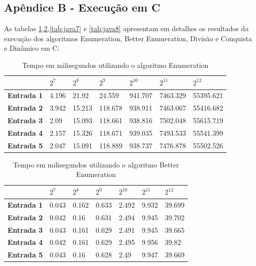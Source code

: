 \documentclass[
	12pt,				%
	oneside,   	        %
	a4paper,			%
	english,			%
	french,				%
	spanish,			%
	brazil,				%
	]{pacotes/abntex2}
\begin{document}
\begin{apendicesenv}

\section*{Apêndice B - Execução em C}

As tabelas \ref{tab:java5},\ref{tab:java6},\ref{tab:java7} e \ref{tab:java8} apresentam em detalhes os resultados da execução dos
algoritmos Enumeration, Better Enumeration, Divisão e Conquista e Dinâmico em C:

\begin{table}[!htb]
\centering
\caption{Tempo em milisegundos utilizando o algoritmo Enumeration}
\label{tab:java5}
\footnotesize   %
\begin{tabular}{l|llllll}
\toprule
& \textbf{$2^7$} & \textbf{$2^8$} & \textbf{$2^9$} & \textbf{$2^{10}$} & \textbf{$2^{11}$} & \textbf{$2^{12}$}\\ 
\midrule
\textbf{Entrada 1} & 4.196 & 21.92 & 24.559 & 941.707 & 7463.329 & 55395.621 \\
\textbf{Entrada 2} & 3.942 & 15.213 & 118.678 &	938.911 & 7463.067 & 55416.682\\ 
\textbf{Entrada 3} & 2.09 & 15.093 & 118.661 &	938.816 & 7502.048 & 55615.719\\ 
\textbf{Entrada 4} & 2.157 & 15.326 & 118.671 &	939.035 & 7493.533 & 55541.399\\ 
\textbf{Entrada 5} & 2.047 & 15.091 & 118.889 &	938.737 & 7476.878 & 55502.526\\ 
 \bottomrule
\end{tabular}
\end{table}


\begin{table}[!htb]
\centering
\caption{Tempo em milisegundos utilizando o algoritmo Better Enumeration}
\label{tab:java6}
\footnotesize   %
\begin{tabular}{l|llllll}
\toprule
& \textbf{$2^7$} & \textbf{$2^8$} & \textbf{$2^9$} & \textbf{$2^{10}$} & \textbf{$2^{11}$} & \textbf{$2^{12}$}\\ 
\midrule
\textbf{Entrada 1} & 0.043 & 0.162 & 0.633 & 2.492 & 9.932 & 39.699\\
\textbf{Entrada 2} & 0.042 & 0.16 & 0.631 & 2.494 & 9.945 & 39.702\\
\textbf{Entrada 3} & 0.043 & 0.161 & 0.629 & 2.491 & 9.945 & 39.665\\
\textbf{Entrada 4} & 0.042 & 0.161 & 0.629 & 2.495 & 9.956	& 39.82\\
\textbf{Entrada 5} & 0.043 & 0.16 & 0.628 &	2.49 & 9.947 & 39.669\\
 \bottomrule
\end{tabular}
\end{table}


\end{apendicesenv}
\end{document}
